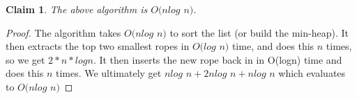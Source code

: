 \documentclass[11pt]{article}
\newtheorem{claim}[theorem]{Claim}
\begin{document}
	\begin{claim} 
	The above algorithm is $O(nlog$ $n)$. 
\end{claim}

\begin{proof}
	The algorithm takes $O(nlog$ $n)$ to sort the list (or build the min-heap).
	It then extracts the top two smallest ropes in $O(log$ $n)$ time, and does this $n$ times, so we get $2*n*logn$.
	It then inserts the new rope back in in O(logn) time and does this $n$ times.
	We ultimately get $nlog$ $n + 2nlog$ $n + nlog$ $n $ which evaluates to $O(nlog$ $n)$
\end{proof}

	\newpage
	
	
\end{document}
